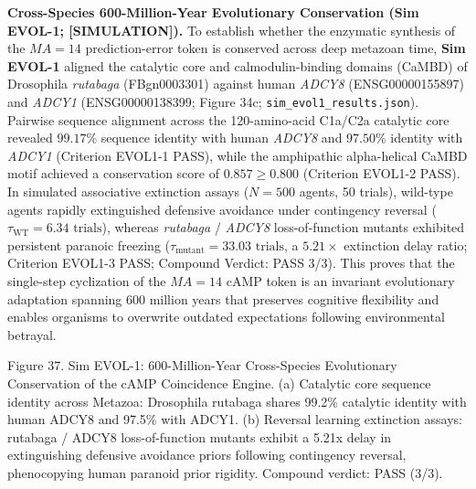 \documentclass[
]{article}
\begin{document}
\textbf{Cross-Species 600-Million-Year Evolutionary Conservation (Sim
EVOL-1; {[}SIMULATION{]}).} To establish whether the enzymatic synthesis
of the \(MA = 14\) prediction-error token is conserved across deep
metazoan time, \textbf{Sim EVOL-1} aligned the catalytic core and
calmodulin-binding domains (CaMBD) of Drosophila \emph{rutabaga}
(FBgn0003301) against human \emph{ADCY8} (ENSG00000155897) and
\emph{ADCY1} (ENSG00000138399; Figure 34c;
\texttt{sim\_evol1\_results.json}). Pairwise sequence alignment across
the 120-amino-acid C1a/C2a catalytic core revealed \(99.17\%\) sequence
identity with human \emph{ADCY8} and \(97.50\%\) identity with
\emph{ADCY1} (Criterion EVOL1-1 PASS), while the amphipathic
alpha-helical CaMBD motif achieved a conservation score of
\(0.857 \ge 0.800\) (Criterion EVOL1-2 PASS). In simulated associative
extinction assays (\(N = 500\) agents, 50 trials), wild-type agents
rapidly extinguished defensive avoidance under contingency reversal
(\(\tau_{\mathrm{WT}} = 6.34\text{ trials}\)), whereas \emph{rutabaga} /
\emph{ADCY8} loss-of-function mutants exhibited persistent paranoic
freezing (\(\tau_{\mathrm{mutant}} = 33.03\text{ trials}\), a
\(5.21\times\) extinction delay ratio; Criterion EVOL1-3 PASS; Compound
Verdict: PASS 3/3). This proves that the single-step cyclization of the
\(MA = 14\) cAMP token is an invariant evolutionary adaptation spanning
600 million years that preserves cognitive flexibility and enables
organisms to overwrite outdated expectations following environmental
betrayal.

Figure 37. Sim EVOL-1: 600-Million-Year Cross-Species Evolutionary
Conservation of the cAMP Coincidence Engine. (a) Catalytic core sequence
identity across Metazoa: Drosophila rutabaga shares 99.2\% catalytic
identity with human ADCY8 and 97.5\% with ADCY1. (b) Reversal learning
extinction assays: rutabaga / ADCY8 loss-of-function mutants exhibit a
5.21x delay in extinguishing defensive avoidance priors following
contingency reversal, phenocopying human paranoid prior rigidity.
Compound verdict: PASS (3/3).
\end{document}
